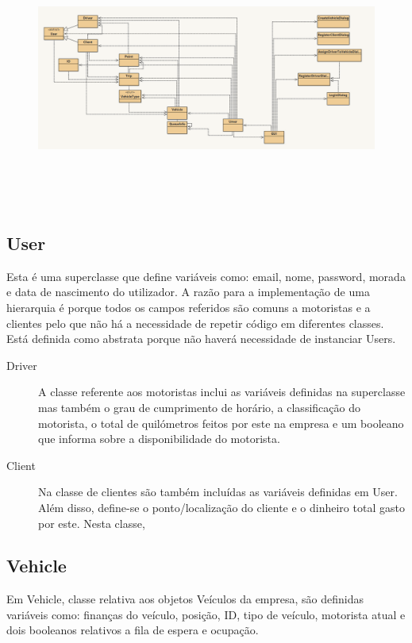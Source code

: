 \documentclass[a4paper]{article}
\begin{document}
\begin{figure}[htbp]
    \centering
    \includegraphics[width = 420pt, height = 240pt]{bluej}
\end{figure}

\pagebreak

\subsection{User}
Esta é uma superclasse que define variáveis como: email, nome, password, morada e data de nascimento do utilizador. A razão para a implementação de uma hierarquia é porque todos os campos referidos são comuns a motoristas e a clientes pelo que não há a necessidade de repetir código em diferentes classes. Está definida como abstrata porque não haverá necessidade de instanciar Users.

\begin{description}
    \item[Driver] A classe referente aos motoristas inclui as variáveis definidas na superclasse mas também o grau de cumprimento de horário, a classificação do motorista, o total de quilómetros feitos por este na empresa e um booleano que informa sobre a disponibilidade do motorista.

    \item[Client] Na classe de clientes são também incluídas as variáveis definidas em User. Além disso, define-se o ponto/localização do cliente e o dinheiro total gasto por este. Nesta classe,

\end{description}

\subsection{Vehicle}
Em Vehicle, classe relativa aos objetos Veículos da empresa, são definidas variáveis como: finanças do veículo, posição, ID, tipo de veículo, motorista atual e dois booleanos relativos a fila de espera e ocupação.
\end{document}
